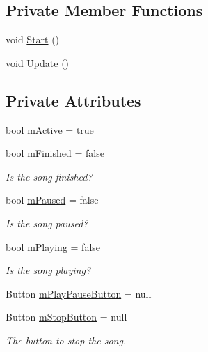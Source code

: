\subsection*{Private Member Functions}
\begin{DoxyCompactItemize}
\item 
void \hyperlink{class_a_t_i___demo_song_button_handler_a723e9581adb3cbc7198af345b8c88b66}{Start} ()
\item 
void \hyperlink{class_a_t_i___demo_song_button_handler_a27b2b6ae2ef7d38ba4212bc4ad280247}{Update} ()
\end{DoxyCompactItemize}
\subsection*{Private Attributes}
\begin{DoxyCompactItemize}
\item 
bool \hyperlink{class_a_t_i___demo_song_button_handler_a14e70250c780214dc71d2aae6d638a25}{m\+Active} = true
\item 
bool \hyperlink{class_a_t_i___demo_song_button_handler_a4a9d01d8ee385c66a6a27da6d9d94f18}{m\+Finished} = false
\begin{DoxyCompactList}\small\item\em Is the song finished? \end{DoxyCompactList}\item 
bool \hyperlink{class_a_t_i___demo_song_button_handler_abee877053d95bfba813d61d5a5d87a23}{m\+Paused} = false
\begin{DoxyCompactList}\small\item\em Is the song paused? \end{DoxyCompactList}\item 
bool \hyperlink{class_a_t_i___demo_song_button_handler_aefbba0db111a0d4ba1b1d9f5c1cae41d}{m\+Playing} = false
\begin{DoxyCompactList}\small\item\em Is the song playing? \end{DoxyCompactList}\item 
Button \hyperlink{class_a_t_i___demo_song_button_handler_a9f3be8593e24316510ca461f105061fd}{m\+Play\+Pause\+Button} = null
\item 
Button \hyperlink{class_a_t_i___demo_song_button_handler_ad6a342b9b2333c8c613b968a0ca7545c}{m\+Stop\+Button} = null
\begin{DoxyCompactList}\small\item\em The button to stop the song. \end{DoxyCompactList}\item 

\end{DoxyCompactItemize}
